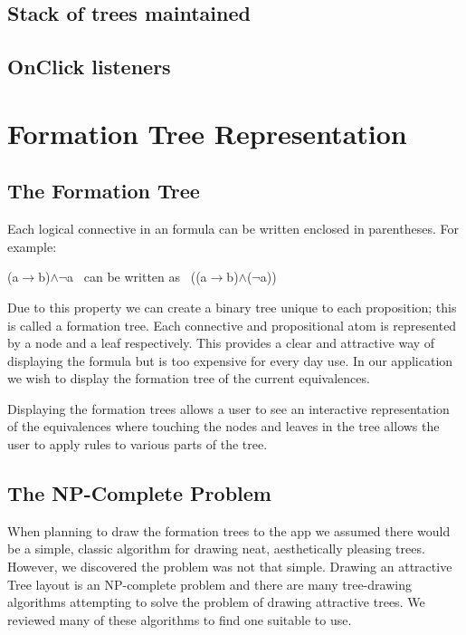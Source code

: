 \documentclass{report}
\begin{document}
\subsection{Stack of trees maintained}
\subsection{OnClick listeners}

\section{Formation Tree Representation}
\label{sec:formation_tree_representation}

\subsection{The Formation Tree}

Each logical connective in an formula can be written enclosed in parentheses. For example:

\begin{center}
(a$\to$b)$\land$$\neg$a \ can be written as \ ((a$\to$b)$\land$($\neg$a))
\end{center}

Due to this property we can create a binary tree unique to each proposition; this is called a formation tree. Each connective and propositional atom is represented by a node and a leaf respectively. This provides a clear and attractive way of displaying the formula but is too expensive for every day use. In our application we wish to display the formation tree of the current equivalences.

Displaying the formation trees allows a user to see an interactive representation of the equivalences where touching the nodes and leaves in the tree allows the user to apply rules to various parts of the tree.

\subsection{The NP-Complete Problem}

When planning to draw the formation trees to the app we assumed there would be a simple, classic algorithm for drawing neat, aesthetically pleasing trees. However, we discovered the problem was not that simple. Drawing an attractive Tree layout is an NP-complete problem\cite{npcompletetrees} and there are many tree-drawing algorithms attempting to solve the problem of drawing attractive trees. We reviewed many of these algorithms to find one suitable to use.
\end{document}
